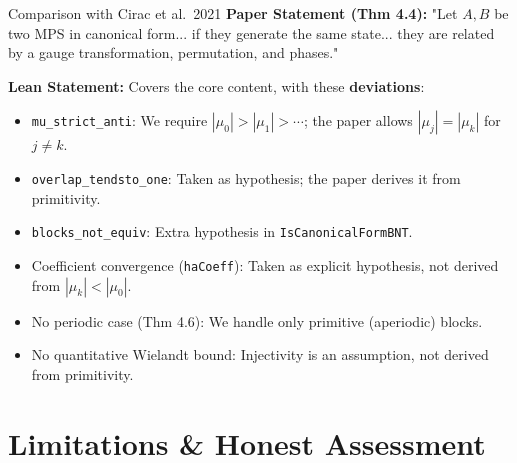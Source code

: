 \documentclass[aspectratio=169,10pt]{beamer}
\begin{document}
\begin{frame}{Comparison with Cirac et al.\ 2021}
    \textbf{Paper Statement (Thm 4.4):}
    "Let $A, B$ be two MPS in canonical form... if they generate the same state... they are related by a gauge transformation, permutation, and phases."

    \vspace{0.5em}
    \textbf{Lean Statement:} Covers the core content, with these \textbf{deviations}:
    \begin{itemize}
        \item \texttt{mu\_strict\_anti}: We require $|\mu_0| > |\mu_1| > \cdots$; the paper allows $|\mu_j| = |\mu_k|$ for $j \neq k$.
        \item \texttt{overlap\_tendsto\_one}: Taken as hypothesis; the paper derives it from primitivity.
        \item \texttt{blocks\_not\_equiv}: Extra hypothesis in \texttt{IsCanonicalFormBNT}.
        \item Coefficient convergence (\texttt{haCoeff}): Taken as explicit hypothesis, not derived from $|\mu_k| < |\mu_0|$.
        \item No periodic case (Thm 4.6): We handle only primitive (aperiodic) blocks.
        \item No quantitative Wielandt bound: Injectivity is an assumption, not derived from primitivity.
    \end{itemize}
\end{frame}

\section{Limitations \& Honest Assessment}
\end{document}
